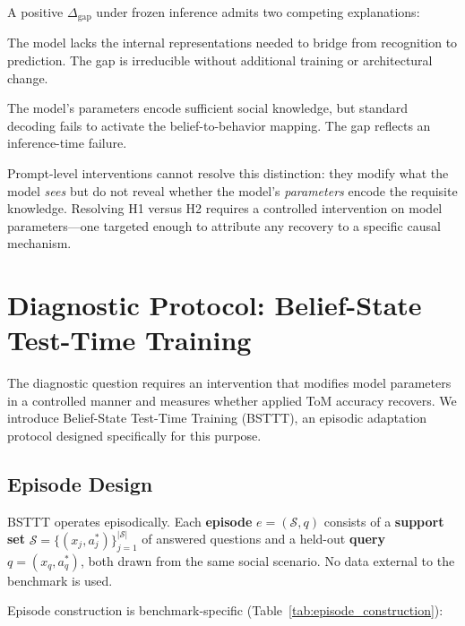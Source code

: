 \documentclass{article}
\begin{document}
A positive $\Delta_\mathrm{gap}$ under frozen inference admits two competing explanations:
%
\begin{description}[leftmargin=1.5em,labelwidth=1.5em,itemsep=2pt]
    \item[\textbf{H1} (Capacity deficit):] The model lacks the internal representations needed to bridge from recognition to prediction. The gap is irreducible without additional training or architectural change.
    \item[\textbf{H2} (Latent competence):] The model's parameters encode sufficient social knowledge, but standard decoding fails to activate the belief-to-behavior mapping. The gap reflects an inference-time failure.
\end{description}
%
Prompt-level interventions cannot resolve this distinction: they modify what the model \emph{sees} but do not reveal whether the model's \emph{parameters} encode the requisite knowledge.
Resolving H1 versus H2 requires a controlled intervention on model parameters---one targeted enough to attribute any recovery to a specific causal mechanism.


\section{Diagnostic Protocol: Belief-State Test-Time Training}
\label{sec:bsttt}

The diagnostic question requires an intervention that modifies model parameters in a controlled manner and measures whether applied ToM accuracy recovers.
We introduce Belief-State Test-Time Training (BSTTT), an episodic adaptation protocol designed specifically for this purpose.

\subsection{Episode Design}
\label{sec:episode_design}

BSTTT operates episodically.
Each \textbf{episode} $e = (\mathcal{S}, q)$ consists of a \textbf{support set} $\mathcal{S} = \{(x_j, a_j^*)\}_{j=1}^{|\mathcal{S}|}$ of answered questions and a held-out \textbf{query} $q = (x_q, a_q^*)$, both drawn from the same social scenario.
No data external to the benchmark is used.

Episode construction is benchmark-specific (Table~\ref{tab:episode_construction}):
\end{document}

